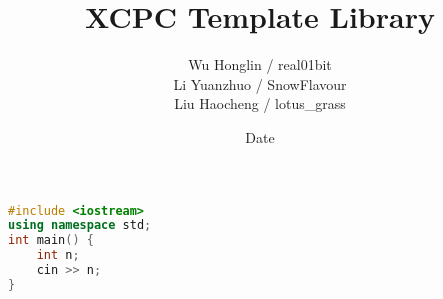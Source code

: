\documentclass[12pt, a4paper]{book}
\title{\Huge XCPC Template Library}
\author{
    Wu Honglin / real01bit \\
    Li Yuanzhuo / SnowFlavour \\
    Liu Haocheng / lotus\_grass \\
}
\date{Date}
\begin{document}
\begin{lstlisting}[language={C++}]
#include <iostream>
using namespace std;
int main() {
    int n;
    cin >> n;
}
\end{lstlisting}
\end{document}
